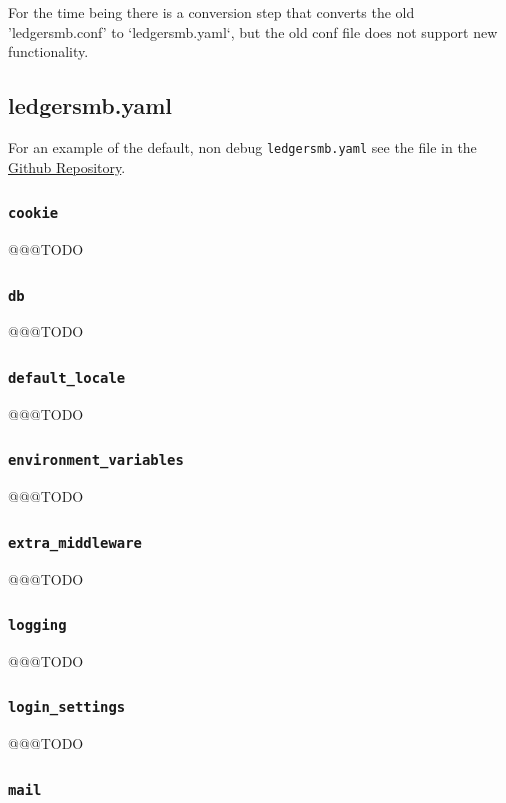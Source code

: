 For the time being there is a conversion step that converts the old 'ledgersmb.conf' to `ledgersmb.yaml`, but the old conf file does not support new functionality.

\subsection{ledgersmb.yaml}
\label{subsec-global-config-ledgersmb-yaml}

For an example of the default, non debug \texttt{ledgersmb.yaml}  see the file in the \href{https://github.com/ledgersmb/LedgerSMB/blob/master/doc/conf/ledgersmb.yaml}{Github Repository}.

\subsubsection{\texttt{cookie}}
 @@@TODO

\subsubsection{\texttt{db}}
 @@@TODO

\subsubsection{\texttt{default\_locale}}
@@@TODO

\subsubsection{\texttt{environment\_variables}}
 @@@TODO

\subsubsection{\texttt{extra\_middleware}}
@@@TODO

\subsubsection{\texttt{logging}}
@@@TODO

\subsubsection{\texttt{login\_settings}}
@@@TODO

\subsubsection{\texttt{mail}}

